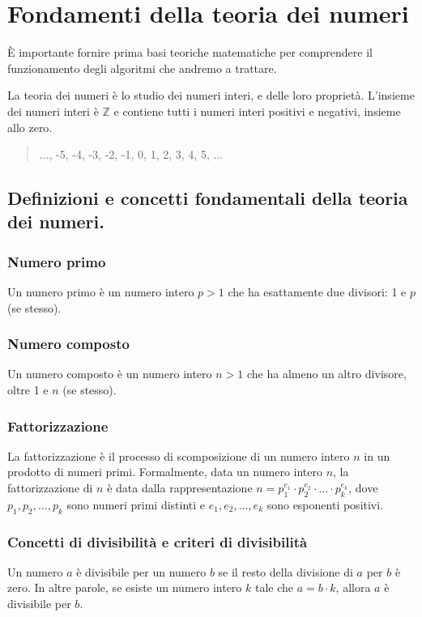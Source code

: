 \documentclass[a4paper,12pt]{report}
\begin{document}
\chapter{Fondamenti della teoria dei numeri}
È importante fornire prima basi teoriche matematiche per comprendere il funzionamento degli algoritmi che andremo a trattare.

La teoria dei numeri è lo studio dei numeri interi, e delle loro proprietà. L'insieme dei numeri interi è $\mathbb{Z}$ e contiene tutti i numeri interi positivi e negativi, insieme allo zero.
\begin{quote}
	\centering
	..., -5, -4, -3, -2, -1, 0, 1, 2, 3, 4, 5, ...
\end{quote}
\section{Definizioni e concetti fondamentali della teoria dei numeri.}

\subsection*{Numero primo}
Un numero primo è un numero intero \( p > 1 \) che ha esattamente due divisori: 1 e \(p\) (se stesso).

\subsection*{Numero composto}
Un numero composto è un numero intero \( n > 1 \) che ha almeno un altro divisore, oltre 1 e \( n \) (se stesso).

\subsection*{Fattorizzazione}
La fattorizzazione è il processo di scomposizione di un numero intero \( n \) in un prodotto di numeri primi. Formalmente, data un numero intero \( n \), la fattorizzazione di \( n \) è data dalla rappresentazione \( n = p_1^{e_1} \cdot p_2^{e_2} \cdot \ldots \cdot p_k^{e_k} \), dove \( p_1, p_2, \ldots, p_k \) sono numeri primi distinti e \( e_1, e_2, \ldots, e_k \) sono esponenti positivi.

\subsection*{Concetti di divisibilità e criteri di divisibilità}

Un numero \(a\) è divisibile per un numero \(b\) se il resto della divisione di \(a\) per \(b\) è zero. In altre parole, se esiste un numero intero \(k\) tale che \(a = b \cdot k\), allora \(a\) è divisibile per \(b\).
\end{document}

